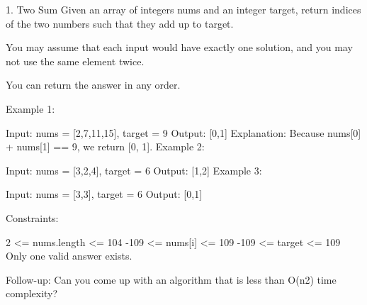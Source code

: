 1. Two Sum
   Given an array of integers nums and an integer target, return indices of the two numbers such that they add up to target.

You may assume that each input would have exactly one solution, and you may not use the same element twice.

You can return the answer in any order.

Example 1:

Input: nums = [2,7,11,15], target = 9
Output: [0,1]
Explanation: Because nums[0] + nums[1] == 9, we return [0, 1].
Example 2:

Input: nums = [3,2,4], target = 6
Output: [1,2]
Example 3:

Input: nums = [3,3], target = 6
Output: [0,1]

Constraints:

2 <= nums.length <= 104
-109 <= nums[i] <= 109
-109 <= target <= 109
Only one valid answer exists.

Follow-up: Can you come up with an algorithm that is less than O(n2) time complexity?
